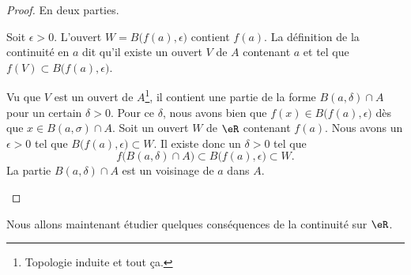 \begin{proof}
    En deux parties.
    \begin{subproof}
        Soit \( \epsilon>0\). L'ouvert \( W=B\big( f(a),\epsilon \big)\) contient \( f(a)\). La définition de la continuité en \( a\) dit qu'il existe un ouvert \( V\) de \( A\) contenant \( a\) et tel que \( f(V)\subset B\big( f(a),\epsilon \big)\).

        Vu que \( V\) est un ouvert de \( A\)\footnote{Topologie induite et tout ça.}, il contient une partie de la forme \( B(a,\delta)\cap A\) pour un certain \( \delta>0\). Pour ce \( \delta\), nous avons bien  que \(f(x)\in B\big( f(a), \epsilon \big) \) dès que \( x\in B(a,\sigma)\cap A\).
        Soit un ouvert \( W\) de \( \eR\) contenant \( f(a)\). Nous avons un \( \epsilon>0\) tel que \( B\big( f(a),\epsilon \big)\subset W\). Il existe donc un \( \delta>0\) tel que 
        \begin{equation}
            f\big( B(a,\delta)\cap A \big)\subset B\big( f(a),\epsilon \big)\subset W.
        \end{equation}
        La partie \( B(a,\delta)\cap A\) est un voisinage de \( a\) dans \( A\).
    \end{subproof}
\end{proof}

Nous allons maintenant étudier quelques conséquences de la continuité sur \( \eR\).

